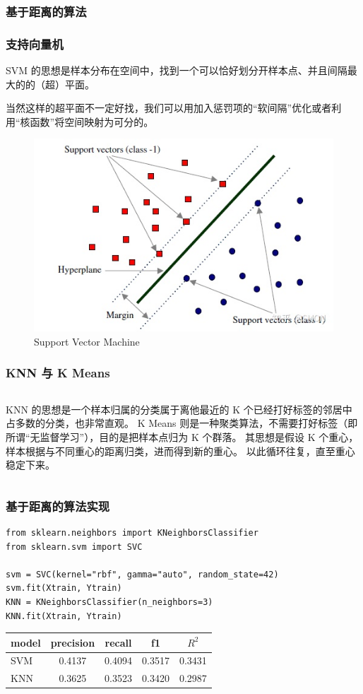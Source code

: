 \documentclass{ctexbeamer}
\begin{document}
\subsubsection{基于距离的算法}
\begin{frame}
    \frametitle{支持向量机}
    SVM 的思想是样本分布在空间中，找到一个可以恰好划分开样本点、并且间隔最大的的（超）平面。

    当然这样的超平面不一定好找，我们可以用加入惩罚项的“软间隔”优化或者利用“核函数”将空间映射为可分的。

    \begin{center}
        \begin{figure}
            \includegraphics[width=0.6\linewidth]{../lib/SVM.jpeg}
            \caption{Support Vector Machine}
        \end{figure}
    \end{center}
\end{frame}
\begin{frame}
    \frametitle{KNN 与 K Means}
    \begin{columns}
        KNN 的思想是一个样本归属的分类属于离他最近的 K 个已经打好标签的邻居中占多数的分类，也非常直观。
        K Means 则是一种聚类算法，不需要打好标签（即所谓“无监督学习”），目的是把样本点归为 K 个群落。
        其思想是假设 K 个重心，样本根据与不同重心的距离归类，进而得到新的重心。
        以此循环往复，直至重心稳定下来。
    \end{columns}
\end{frame}
\begin{frame}[fragile]
    \frametitle{基于距离的算法实现}
    \begin{verbatim}
from sklearn.neighbors import KNeighborsClassifier
from sklearn.svm import SVC

svm = SVC(kernel="rbf", gamma="auto", random_state=42)
svm.fit(Xtrain, Ytrain)
KNN = KNeighborsClassifier(n_neighbors=3)
KNN.fit(Xtrain, Ytrain)
    \end{verbatim}
    \begin{center}
        \begin{tabular}{l|cccc}
            model & precision & recall & f1     & \(R^2\) \\ \hline
            SVM   & 0.4137    & 0.4094 & 0.3517 & 0.3431  \\
            KNN   & 0.3625    & 0.3523 & 0.3420 & 0.2987  \\
        \end{tabular}
    \end{center}
\end{frame}
\end{document}
